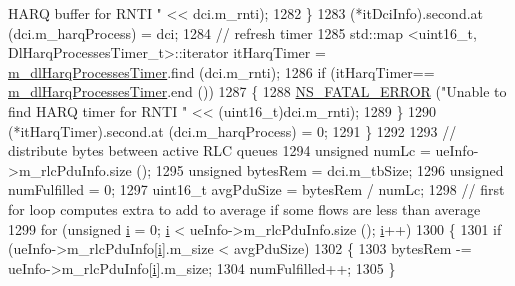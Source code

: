 \begin{DoxyCode}
{       HARQ buffer for RNTI "} << dci.m\_rnti);
1282                                 \}
1283                                 (*itDciInfo).second.at (dci.m\_harqProcess) = dci;
1284                                 \textcolor{comment}{// refresh timer}
1285                                 std::map <uint16\_t, DlHarqProcessesTimer\_t>::iterator itHarqTimer =  
      \hyperlink{classns3_1_1MmWaveFlexTtiMaxRateMacScheduler_a8e10f292f6acda7b901589a74252dc95}{m\_dlHarqProcessesTimer}.find (dci.m\_rnti);
1286                                 \textcolor{keywordflow}{if} (itHarqTimer== \hyperlink{classns3_1_1MmWaveFlexTtiMaxRateMacScheduler_a8e10f292f6acda7b901589a74252dc95}{m\_dlHarqProcessesTimer}.end ())
1287                                 \{
1288                                         \hyperlink{group__fatal_ga5131d5e3f75d7d4cbfd706ac456fdc85}{NS\_FATAL\_ERROR} (\textcolor{stringliteral}{"Unable to find HARQ timer for RNTI "}
       << (uint16\_t)dci.m\_rnti);
1289                                 \}
1290                                 (*itHarqTimer).second.at (dci.m\_harqProcess) = 0;
1291                         \}
1292 
1293                         \textcolor{comment}{// distribute bytes between active RLC queues}
1294                         \textcolor{keywordtype}{unsigned} numLc = ueInfo->m\_rlcPduInfo.size ();
1295                         \textcolor{keywordtype}{unsigned} bytesRem = dci.m\_tbSize;
1296                         \textcolor{keywordtype}{unsigned} numFulfilled = 0;
1297                         uint16\_t avgPduSize = bytesRem / numLc;
1298                         \textcolor{comment}{// first for loop computes extra to add to average if some flows are less than
       average}
1299                         \textcolor{keywordflow}{for} (\textcolor{keywordtype}{unsigned} \hyperlink{bernuolliDistribution_8m_a6f6ccfcf58b31cb6412107d9d5281426}{i} = 0; \hyperlink{bernuolliDistribution_8m_a6f6ccfcf58b31cb6412107d9d5281426}{i} < ueInfo->m\_rlcPduInfo.size (); 
      \hyperlink{bernuolliDistribution_8m_a6f6ccfcf58b31cb6412107d9d5281426}{i}++)
1300                         \{
1301                                 \textcolor{keywordflow}{if} (ueInfo->m\_rlcPduInfo[\hyperlink{bernuolliDistribution_8m_a6f6ccfcf58b31cb6412107d9d5281426}{i}].m\_size < avgPduSize)
1302                                 \{
1303                                         bytesRem -= ueInfo->m\_rlcPduInfo[\hyperlink{bernuolliDistribution_8m_a6f6ccfcf58b31cb6412107d9d5281426}{i}].m\_size;
1304                                         numFulfilled++;
1305                                 \}

\end{DoxyCode}
